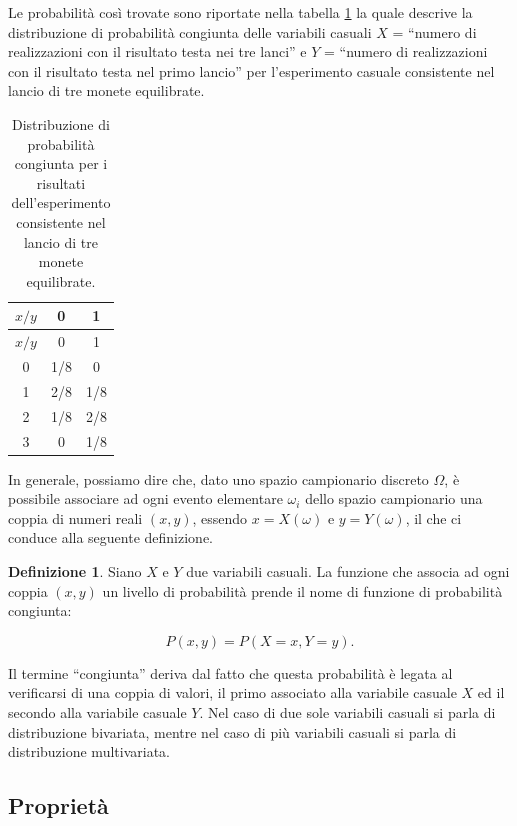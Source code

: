 \documentclass[
  11pt,
]{krantz}
\theoremstyle{definition}
\newtheorem{definition}{Definizione}[chapter]
\theoremstyle{definition}
\theoremstyle{definition}
\theoremstyle{definition}
\theoremstyle{remark}
\begin{document}
Le probabilità così trovate sono riportate nella tabella \ref{tab:ditr-cong-biv-1} la quale descrive la distribuzione di probabilità congiunta delle variabili casuali \(X\) = ``numero di realizzazioni con il risultato testa nei tre lanci'' e \(Y\) = ``numero di realizzazioni con il risultato testa nel primo lancio'' per l'esperimento casuale consistente nel lancio di tre monete equilibrate.

\begin{longtable}[]{@{}ccc@{}}
\caption{\label{tab:ditr-cong-biv-1} Distribuzione di probabilità congiunta per i risultati dell'esperimento consistente nel lancio di tre monete equilibrate.}\tabularnewline
\toprule
\(x / y\) & 0 & 1 \\
\midrule
\endfirsthead
\toprule
\(x / y\) & 0 & 1 \\
\midrule
\endhead
0 & 1/8 & 0 \\
1 & 2/8 & 1/8 \\
2 & 1/8 & 2/8 \\
3 & 0 & 1/8 \\
\bottomrule
\end{longtable}

In generale, possiamo dire che, dato uno spazio campionario discreto \(\Omega\), è possibile associare ad ogni evento elementare \(\omega_i\) dello spazio campionario una coppia di numeri reali \((x, y)\), essendo \(x = X(\omega)\) e \(y = Y(\omega)\), il che ci conduce alla seguente definizione.

\begin{definition}
Siano \(X\) e \(Y\) due variabili casuali. La funzione che associa ad ogni coppia \((x, y)\) un livello di probabilità prende il nome di funzione di probabilità congiunta:

\[
P(x, y) = P(X = x, Y = y).
\]
\end{definition}

\noindent Il termine ``congiunta'' deriva dal fatto che questa probabilità è legata al verificarsi di una coppia di valori, il primo associato alla variabile casuale \(X\) ed il secondo alla variabile casuale \(Y\). Nel caso di due sole variabili casuali si parla di distribuzione bivariata, mentre nel caso di più variabili casuali si parla di distribuzione multivariata.

\hypertarget{proprietuxe0}{%
\subsection{Proprietà}\label{proprietuxe0}}
\end{document}
